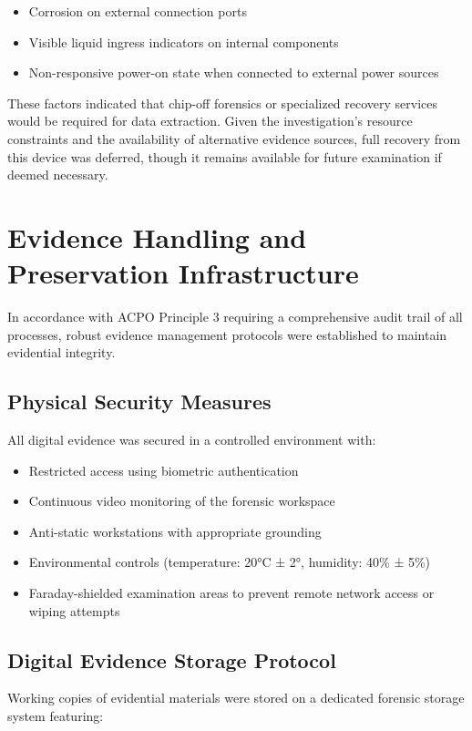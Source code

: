 \begin{itemize}
    \item Corrosion on external connection ports
    \item Visible liquid ingress indicators on internal components
    \item Non-responsive power-on state when connected to external power sources
\end{itemize}

These factors indicated that chip-off forensics or specialized recovery services would be required for data extraction. Given the investigation's resource constraints and the availability of alternative evidence sources, full recovery from this device was deferred, though it remains available for future examination if deemed necessary.

\section{Evidence Handling and Preservation Infrastructure}
In accordance with ACPO Principle 3 requiring a comprehensive audit trail of all processes, robust evidence management protocols were established to maintain evidential integrity.

\subsection{Physical Security Measures}
All digital evidence was secured in a controlled environment with:

\begin{itemize}
    \item Restricted access using biometric authentication
    \item Continuous video monitoring of the forensic workspace
    \item Anti-static workstations with appropriate grounding
    \item Environmental controls (temperature: 20°C ± 2°, humidity: 40\% ± 5\%)
    \item Faraday-shielded examination areas to prevent remote network access or wiping attempts
\end{itemize}

\subsection{Digital Evidence Storage Protocol}
Working copies of evidential materials were stored on a dedicated forensic storage system featuring:

